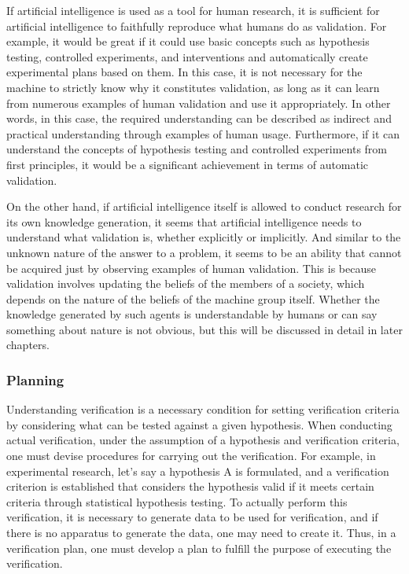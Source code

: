 \documentclass{book}
\begin{document}
If artificial intelligence is used as a tool for human research, it is sufficient for artificial intelligence to faithfully reproduce what humans do as validation. For example, it would be great if it could use basic concepts such as hypothesis testing, controlled experiments, and interventions and automatically create experimental plans based on them. In this case, it is not necessary for the machine to strictly know why it constitutes validation, as long as it can learn from numerous examples of human validation and use it appropriately. In other words, in this case, the required understanding can be described as indirect and practical understanding through examples of human usage. Furthermore, if it can understand the concepts of hypothesis testing and controlled experiments from first principles, it would be a significant achievement in terms of automatic validation.

On the other hand, if artificial intelligence itself is allowed to conduct research for its own knowledge generation, it seems that artificial intelligence needs to understand what validation is, whether explicitly or implicitly. And similar to the unknown nature of the answer to a problem, it seems to be an ability that cannot be acquired just by observing examples of human validation. This is because validation involves updating the beliefs of the members of a society, which depends on the nature of the beliefs of the machine group itself. Whether the knowledge generated by such agents is understandable by humans or can say something about nature is not obvious, but this will be discussed in detail in later chapters.

\subsubsection{Planning}
Understanding verification is a necessary condition for setting verification criteria by considering what can be tested against a given hypothesis. When conducting actual verification, under the assumption of a hypothesis and verification criteria, one must devise procedures for carrying out the verification. For example, in experimental research, let's say a hypothesis A is formulated, and a verification criterion is established that considers the hypothesis valid if it meets certain criteria through statistical hypothesis testing. To actually perform this verification, it is necessary to generate data to be used for verification, and if there is no apparatus to generate the data, one may need to create it. Thus, in a verification plan, one must develop a plan to fulfill the purpose of executing the verification.
\end{document}
